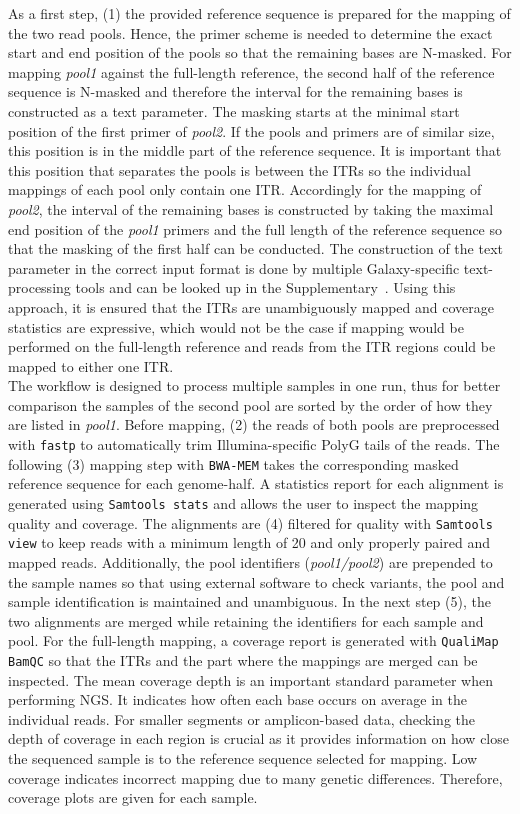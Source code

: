 As a first step, (1) the provided reference sequence is prepared for the mapping of the two read pools. Hence, the primer scheme is needed to determine the exact start and end position of the pools so that the remaining bases are N-masked. For mapping \textit{pool1} against the full-length reference, the second half of the reference sequence is N-masked and therefore the interval for the remaining bases is constructed as a text parameter. The masking starts at the minimal start position of the first primer of \textit{pool2}. If the pools and primers are of similar size, this position is in the middle part of the reference sequence. It is important that this position that separates the pools is between the \acp{ITR} so the individual mappings of each pool only contain one \ac{ITR}. Accordingly for the mapping of \textit{pool2}, the interval of the remaining bases is constructed by taking the maximal end position of the \textit{pool1} primers and the full length of the reference sequence so that the masking of the first half can be conducted. The construction of the text parameter in the correct input format is done by multiple Galaxy-specific text-processing tools and can be looked up in the Supplementary~. Using this approach, it is ensured that the \acp{ITR} are unambiguously mapped and coverage statistics are expressive, which would not be the case if mapping would be performed on the full-length reference and reads from the \ac{ITR} regions could be mapped to either one \ac{ITR}. \\
The workflow is designed to process multiple samples in one run, thus for better comparison the samples of the second pool are sorted by the order of how they are listed in \textit{pool1}. Before mapping, (2) the reads of both pools are preprocessed with \texttt{fastp} to automatically trim Illumina-specific PolyG tails of the reads. The following (3) mapping step with \texttt{BWA-MEM} takes the corresponding masked reference sequence for each genome-half. A statistics report for each alignment is generated using \texttt{Samtools stats} and allows the user to inspect the mapping quality and coverage. The alignments are (4) filtered for quality with \texttt{Samtools view} to keep reads with a minimum length of 20 and only properly paired and mapped reads. Additionally, the pool identifiers (\textit{pool1/pool2}) are prepended to the sample names so that using external software to check variants, the pool and sample identification is maintained and unambiguous. In the next step (5), the two alignments are merged while retaining the identifiers for each sample and pool. For the full-length mapping, a coverage report is generated with \texttt{QualiMap BamQC} so that the \acp{ITR} and the part where the mappings are merged can be inspected. The mean coverage depth is an important standard parameter when performing NGS. It indicates how often each base occurs on average in the individual reads. For smaller segments or amplicon-based data, checking the depth of coverage in each region is crucial as it provides information on how close the sequenced sample is to the reference sequence selected for mapping. Low coverage indicates incorrect mapping due to many genetic differences. Therefore, coverage plots are given for each sample. \\
